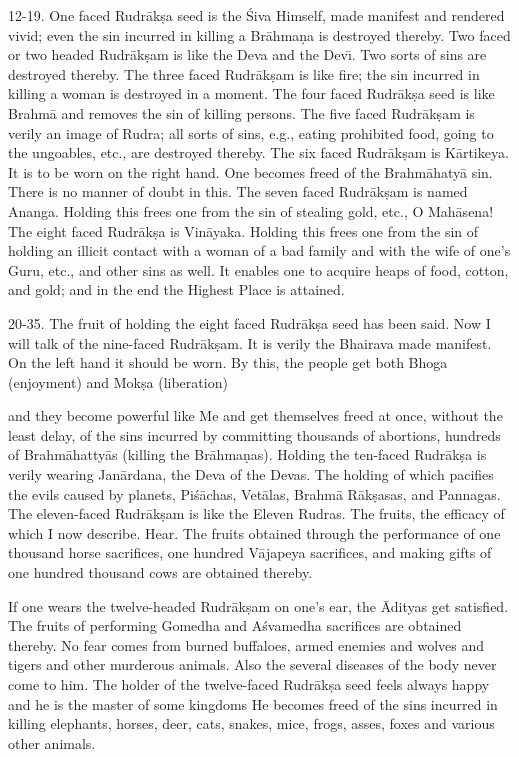 12-19. One faced Rudr\=ak\d{s}a seed is the \'Siva Himself, made manifest and rendered vivid; even the sin incurred in killing a Br\=ahma\d{n}a is destroyed thereby. Two faced or two headed Rudr\=ak\d{s}am is like the Deva and the Dev\={\i}. Two sorts of sins are destroyed thereby. The three faced Rudr\=ak\d{s}am is like fire; the sin incurred in killing a woman is destroyed in a moment. The four faced Rudr\=ak\d{s}a seed is like Brahm\=a and removes the sin of killing persons. The five faced Rudr\=ak\d{s}am is verily an image of Rudra; all sorts of sins, e.g., eating prohibited food, going to the ungoables, etc., are destroyed thereby. The six faced Rudr\=ak\d{s}am is K\=artikeya. It is to be worn on the right hand. One becomes freed of the Brahm\=ahaty\=a sin. There is no manner of doubt in this. The seven faced Rudr\=ak\d{s}am is named Ananga. Holding this frees one from the sin of stealing gold, etc., O Mah\=asena! The eight faced Rudr\=ak\d{s}a is Vin\=ayaka. Holding this frees one from the sin of holding an illicit contact with a woman of a bad family and with the wife of one's Guru, etc., and other sins as well. It enables one to acquire heaps of food, cotton, and gold; and in the end the Highest Place is attained.

20-35. The fruit of holding the eight faced Rudr\=ak\d{s}a seed has been said. Now I will talk of the nine-faced Rudr\=ak\d{s}am. It is verily the Bhairava made manifest. On the left hand it should be worn. By this, the people get both Bhoga (enjoyment) and Mok\d{s}a (liberation)

and they become powerful like Me and get themselves freed at once, without the least delay, of the sins incurred by committing thousands of abortions, hundreds of Brahm\=ahatty\=as (killing the Br\=ahma\d{n}as). Holding the ten-faced Rudr\=ak\d{s}a is verily wearing Jan\=ardana, the Deva of the Devas. The holding of which pacifies the evils caused by planets, Pi\'s\=achas, Vet\=alas, Brahm\=a R\=ak\d{s}asas, and Pannagas. The eleven-faced Rudr\=ak\d{s}am is like the Eleven Rudras. The fruits, the efficacy of which I now describe. Hear. The fruits obtained through the performance of one thousand horse sacrifices, one hundred V\=ajapeya sacrifices, and making gifts of one hundred thousand cows are obtained thereby.

If one wears the twelve-headed Rudr\=ak\d{s}am on one's ear, the \=Adityas get satisfied. The fruits of performing Gomedha and A\'svamedha sacrifices are obtained thereby. No fear comes from burned buffaloes, armed enemies and wolves and tigers and other murderous animals. Also the several diseases of the body never come to him. The holder of the twelve-faced Rudr\=ak\d{s}a seed feels always happy and he is the master of some kingdoms He becomes freed of the sins incurred in killing elephants, horses, deer, cats, snakes, mice, frogs, asses, foxes and various other animals.

